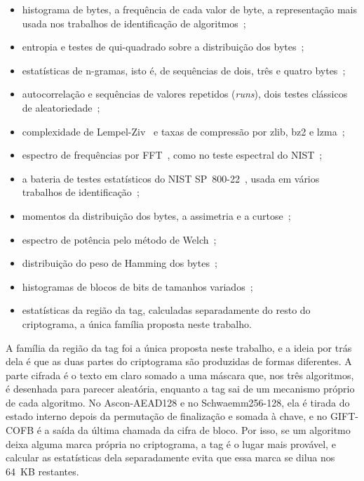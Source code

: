 \begin{itemize}
    \item histograma de bytes, a frequência de cada valor de byte, a representação mais usada nos trabalhos de identificação de algoritmos~\cite{MelloXexeo2016,Barbosa2017};
    \item entropia e testes de qui-quadrado sobre a distribuição dos bytes~\cite{Li2025Generic,Jha2025};
    \item estatísticas de n-gramas, isto é, de sequências de dois, três e quatro bytes~\cite{Jha2025};
    \item autocorrelação e sequências de valores repetidos (\textit{runs}), dois testes clássicos de aleatoriedade~\cite{Menezes1996HAC};
    \item complexidade de Lempel-Ziv~\cite{LempelZiv1976} e taxas de compressão por zlib, bz2 e lzma~\cite{Zhou2025};
    \item espectro de frequências por FFT~\cite{Zhou2025}, como no teste espectral do NIST~\cite{Rukhin2010NIST80022};
    \item a bateria de testes estatísticos do NIST SP~800-22~\cite{Rukhin2010NIST80022}, usada em vários trabalhos de identificação~\cite{yuan2022,Li2025Generic,Yuan2025MLP,Yao2025,Yuan2026Transformer};
    \item momentos da distribuição dos bytes, a assimetria e a curtose~\cite{Zhou2025};
    \item espectro de potência pelo método de Welch~\cite{Zhou2025};
    \item distribuição do peso de Hamming dos bytes~\cite{Zhao2023Hamming};
    \item histogramas de blocos de bits de tamanhos variados~\cite{MelloXexeo2016,Barbosa2017};
    \item estatísticas da região da tag, calculadas separadamente do resto do criptograma, a única família proposta neste trabalho.
\end{itemize}

A família da região da tag foi a única proposta neste trabalho, e a ideia por trás dela é que as duas partes do criptograma são produzidas de formas diferentes. A parte cifrada é o texto em claro somado a uma máscara que, nos três algoritmos, é desenhada para parecer aleatória, enquanto a tag sai de um mecanismo próprio de cada algoritmo. No Ascon-AEAD128 e no Schwaemm256-128, ela é tirada do estado interno depois da permutação de finalização e somada à chave, e no GIFT-COFB é a saída da última chamada da cifra de bloco. Por isso, se um algoritmo deixa alguma marca própria no criptograma, a tag é o lugar mais provável, e calcular as estatísticas dela separadamente evita que essa marca se dilua nos 64~KB restantes.

